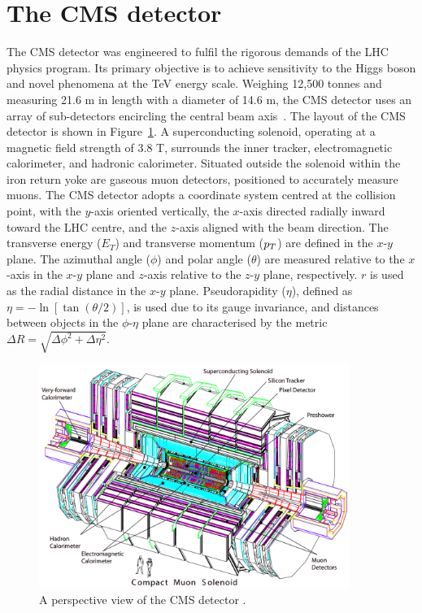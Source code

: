\section{The CMS detector}

The \ac{CMS} detector was engineered to fulfil the rigorous demands of the \ac{LHC} physics program. 
Its primary objective is to achieve sensitivity to the Higgs boson and novel phenomena at the TeV energy scale. 
Weighing 12,500 tonnes and measuring 21.6 m in length with a diameter of 14.6 m, the \ac{CMS} detector uses an array of sub-detectors encircling the central beam axis~\cite{CMS_Setup}. 
The layout of the \ac{CMS} detector is shown in Figure~\ref{fig:CMS_Schematic}.
A superconducting solenoid, operating at a magnetic field strength of 3.8 T, surrounds the inner tracker, electromagnetic calorimeter, and hadronic calorimeter. 
Situated outside the solenoid within the iron return yoke are gaseous muon detectors, positioned to accurately measure muons. 
The \ac{CMS} detector adopts a coordinate system centred at the collision point, with the $y$-axis oriented vertically, the $x$-axis directed radially inward toward the \ac{LHC} centre, and the $z$-axis aligned with the beam direction. 
The transverse energy ($E_T$) and transverse momentum ($p_{T}$) are defined in the $x$-$y$ plane. 
The azimuthal angle ($\phi$) and polar angle ($\theta$) are measured relative to the $x$-axis in the $x$-$y$ plane and $z$-axis relative to the $z$-$y$ plane, respectively. 
$r$ is used as the radial distance in the $x$-$y$ plane.
Pseudorapidity ($\eta$), defined as $\eta = -\ln[\tan(\theta/2)]$, is used due to its gauge invariance, and distances between objects in the $\phi$-$\eta$ plane are characterised by the metric $\Delta R = \sqrt{\Delta\phi^2 + \Delta\eta^2}$. 

\begin{figure}[!hbtp]
    \centering
    \includegraphics[width=0.9\textwidth]{Figures/CMS_Detector.png}
    \caption[Diagram of the CMS detector.]{A perspective view of the \ac{CMS} detector \cite{CMS_Setup}.}
    \label{fig:CMS_Schematic}
\end{figure}

